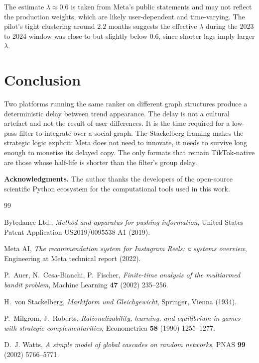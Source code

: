 \documentclass[12pt,a4paper]{article}
\begin{document}
The estimate $\lambda \approx 0.6$ is taken from Meta's public statements and may not reflect the production weights, which are likely user-dependent and time-varying. The pilot's tight clustering around $2.2$ months suggests the effective $\lambda$ during the 2023 to 2024 window was close to but slightly below $0.6$, since shorter lags imply larger $\lambda$.

\section{Conclusion}
\label{sec:conclusion}

Two platforms running the same ranker on different graph structures produce a deterministic delay between trend appearance. The delay is not a cultural artefact and not the result of user differences. It is the time required for a low-pass filter to integrate over a social graph. The Stackelberg framing makes the strategic logic explicit: Meta does not need to innovate, it needs to survive long enough to monetise its delayed copy. The only formats that remain TikTok-native are those whose half-life is shorter than the filter's group delay.

\vspace{1.5em}

\textbf{Acknowledgments.} The author thanks the developers of the open-source scientific Python ecosystem for the computational tools used in this work.

\vspace{0.5em}


\begin{thebibliography}{99}

Bytedance Ltd.,
\textit{Method and apparatus for pushing information},
United States Patent Application US2019/0095538 A1 (2019).

Meta AI,
\textit{The recommendation system for Instagram Reels: a systems overview},
Engineering at Meta technical report (2022).

P.~Auer, N.~Cesa-Bianchi, P.~Fischer,
\textit{Finite-time analysis of the multiarmed bandit problem},
Machine Learning \textbf{47} (2002) 235--256.

H.~von Stackelberg,
\textit{Marktform und Gleichgewicht},
Springer, Vienna (1934).

P.~Milgrom, J.~Roberts,
\textit{Rationalizability, learning, and equilibrium in games with strategic complementarities},
Econometrica \textbf{58} (1990) 1255--1277.

D.~J. Watts,
\textit{A simple model of global cascades on random networks},
PNAS \textbf{99} (2002) 5766--5771.

\end{thebibliography}
\end{document}
